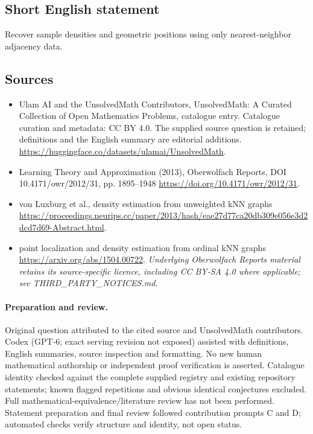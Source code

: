 \documentclass[11pt]{article}
\begin{document}
\subsection{Short English statement}
Recover sample densities and geometric positions using only nearest-neighbor adjacency data.
\subsection{Sources}
\begin{itemize}
\item[\hypertarget{source:statement:1}{S1}] Ulam AI and the UnsolvedMath Contributors, UnsolvedMath: A Curated Collection of Open Mathematics Problems, catalogue entry. Catalogue curation and metadata: CC BY 4.0. The supplied source question is retained; definitions and the English summary are editorial additions.
\url{https://huggingface.co/datasets/ulamai/UnsolvedMath}.
\item[\hypertarget{source:statement:2}{S2}] Learning Theory and Approximation (2013), Oberwolfach Reports, DOI 10.4171/owr/2012/31, pp. 1895--1948
\url{https://doi.org/10.4171/owr/2012/31}.
\item[\hypertarget{source:statement:3}{S3}] von Luxburg et al., density estimation from unweighted kNN graphs
\url{https://proceedings.neurips.cc/paper/2013/hash/eae27d77ca20db309e056e3d2dcd7d69-Abstract.html}.
\item[\hypertarget{source:statement:4}{S4}] point localization and density estimation from ordinal kNN graphs
\url{https://arxiv.org/abs/1504.00722}.
\textit{Underlying Oberwolfach Reports material retains its source-specific licence, including CC BY-SA 4.0 where applicable; see THIRD\_PARTY\_NOTICES.md.}
\end{itemize}
\paragraph{Preparation and review.}
Original question attributed to the cited source and UnsolvedMath contributors. Codex (GPT-6; exact serving revision not exposed) assisted with definitions, English summaries, source inspection and formatting. No new human mathematical authorship or independent proof verification is asserted. Catalogue identity checked against the complete supplied registry and existing repository statements; known flagged repetitions and obvious identical conjectures excluded. Full mathematical-equivalence/literature review has not been performed. Statement preparation and final review followed contribution prompts C and D; automated checks verify structure and identity, not open status.
\label{end:statement}
\end{document}
